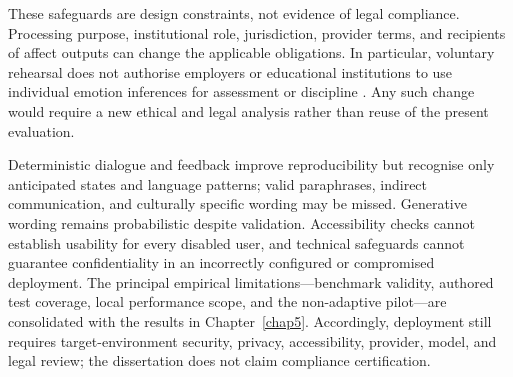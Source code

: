 These safeguards are design constraints, not evidence of legal compliance. Processing purpose, institutional role, jurisdiction, provider terms, and recipients of affect outputs can change the applicable obligations. In particular, voluntary rehearsal does not authorise employers or educational institutions to use individual emotion inferences for assessment or discipline \cite{eu2024aiact}. Any such change would require a new ethical and legal analysis rather than reuse of the present evaluation.

Deterministic dialogue and feedback improve reproducibility but recognise only anticipated states and language patterns; valid paraphrases, indirect communication, and culturally specific wording may be missed. Generative wording remains probabilistic despite validation. Accessibility checks cannot establish usability for every disabled user, and technical safeguards cannot guarantee confidentiality in an incorrectly configured or compromised deployment. The principal empirical limitations---benchmark validity, authored test coverage, local performance scope, and the non-adaptive pilot---are consolidated with the results in Chapter~\ref{chap5}. Accordingly, deployment still requires target-environment security, privacy, accessibility, provider, model, and legal review; the dissertation does not claim compliance certification.
